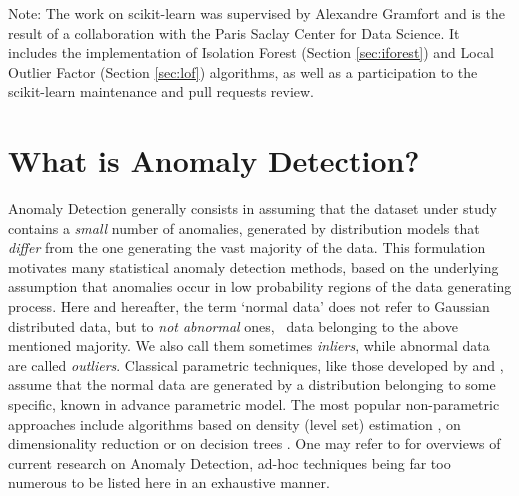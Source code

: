 Note: The work on scikit-learn was supervised by Alexandre Gramfort and is the result of a collaboration with the Paris Saclay Center for Data Science. It includes the implementation of Isolation Forest (Section \ref{sec:iforest}) and Local Outlier Factor (Section \ref{sec:lof}) algorithms, as well as a participation to the scikit-learn maintenance and pull requests review.


\section{What is Anomaly Detection?}
Anomaly Detection %
generally consists in assuming that the dataset under study contains a \textit{small} number of anomalies, generated by distribution models that  \textit{differ} from the one generating the vast majority of the data.
This formulation motivates many statistical anomaly detection methods, based on the underlying assumption that anomalies occur in low probability regions of the data generating process. Here and hereafter, the term `normal data' does not refer to Gaussian distributed data, but to \emph{not abnormal} ones, \ie~data belonging to the above mentioned majority. We also call them sometimes \emph{inliers}, while abnormal data are called \emph{outliers}. 
Classical parametric techniques, like those developed by \cite{Barnett94} and \cite{Eskin2000}, assume that the normal data are generated by a distribution belonging to some  specific, known in advance parametric model.  
The most popular non-parametric approaches include algorithms based on density (level set) estimation \citep{Breunig2000LOF, Scholkopf2001, Steinwart2005, Scott2006, VertVert}, on dimensionality reduction \citep{Shyu2003, Aggarwal2001} or on decision trees \citep{Liu2008, Desir12, Shi2012}.
One may refer to \cite{Hodge2004survey, Chandola2009survey, Patcha2007survey, Markou2003survey} for overviews of current research on Anomaly Detection, ad-hoc techniques being far too numerous to be listed here in an exhaustive manner.


